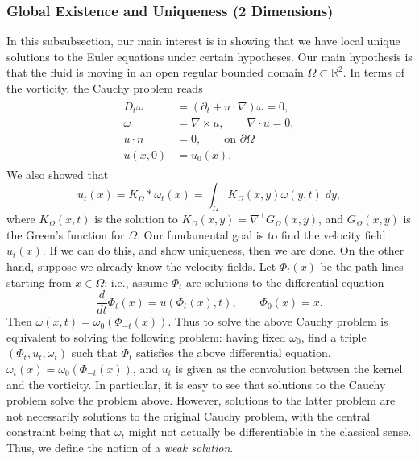 \documentclass{article}
\begin{document}
\subsubsection{Global Existence and Uniqueness (2 Dimensions)}

In this subsubsection,  our main interest is in showing that we have local unique solutions to the Euler equations under certain hypotheses. Our main hypothesis is that the fluid is moving in an open regular bounded domain $\Omega \subset \mathbb{R}^{2}$. In terms of the vorticity, the Cauchy problem reads 
\begin{align*}
	\begin{split}
		D_{t}\omega &= (\partial_{t} + u \cdot \nabla)\omega = 0, \\
		\omega &= \nabla \times u, \qquad \nabla \cdot u = 0, \\
		u \cdot n &= 0, \qquad \text{on $\partial\Omega$} \\
		u(x,0) &= u_{0}(x). 
	\end{split}
\end{align*}
We also showed that 
\begin{equation*}
	u_{t}(x) = K_{\Omega} \ast \omega_{t}(x) = \int_{\Omega}K_{\Omega}(x,y)\omega(y,t)\;dy, 
\end{equation*}
where $K_{\Omega}(x,t)$ is the solution to $K_{\Omega}(x,y) = \nabla^{\perp}G_{\Omega}(x,y)$, and $G_{\Omega}(x,y)$ is the Green's function for $\Omega$. Our fundamental goal is to find the velocity field $u_{t}(x)$. If we can do this, and show uniqueness, then we are done. On the other hand, suppose we already know the velocity fields. Let $\Phi_{t}(x)$ be the path lines starting from $x \in \Omega$; i.e., assume $\Phi_{t}$ are solutions to the differential equation 
\begin{equation}
	\frac{d}{dt}\Phi_{t}(x) = u(\Phi_{t}(x),t), \qquad \Phi_{0}(x)  = x. 
\end{equation}
Then $\omega(x, t) = \omega_{0}(\Phi_{-t}(x))$. Thus to solve the above Cauchy problem is equivalent to solving the following problem: having fixed $\omega_{0}$, find a triple $(\Phi_{t}, u_{t}, \omega_{t})$ such that $\Phi_{t}$ satisfies the above differential equation, $\omega_{t}(x) = \omega_{0}(\Phi_{-t}(x))$, and $u_{t}$ is given as the convolution between the kernel and the vorticity. In particular, it is easy to see that solutions to the Cauchy problem solve the problem above. However, solutions to the latter problem are not necessarily solutions to the original Cauchy problem, with the central constraint being that $\omega_{t}$ might not actually be differentiable in the classical sense. Thus, we define the notion of a \textit{weak solution}. 
\end{document}
